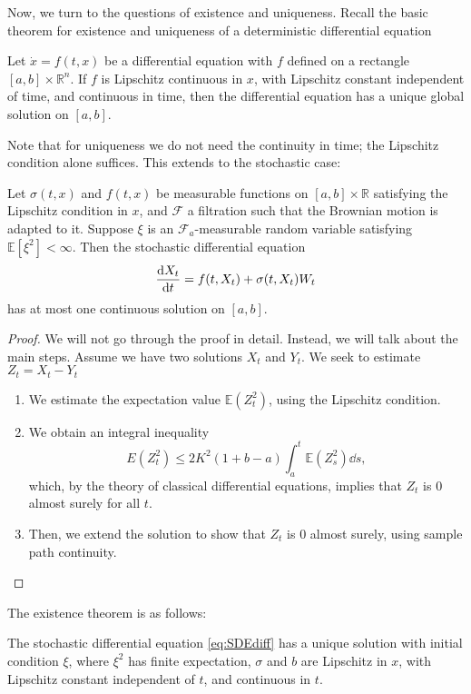 \documentclass[prb,12pt]{revtex4-2}
\theoremstyle{definition}
\theoremstyle{definition}
\theoremstyle{definition}
\newcommand{\R}{\mathbb{R}}
\begin{document}
Now, we turn to the questions of existence and uniqueness. Recall the basic theorem for existence and uniqueness of a deterministic differential equation
\begin{Theorem}
	Let $\dot{x} = f(t,x)$ be a differential equation with $f$ defined on a rectangle $[a,b]\times \R^n$. If $f$ is Lipschitz continuous in $x$, with Lipschitz constant independent of time, and continuous in time, then the differential equation has a unique global solution on $[a,b]$.
\end{Theorem}
Note that for uniqueness we do not need the continuity in time; the Lipschitz condition alone suffices. This extends to the stochastic case:
\begin{Theorem}
	Let $\sigma(t,x)$ and $f(t,x)$ be measurable functions on $[a,b]\times \R$ satisfying the Lipschitz condition in $x$, and $\mathcal{F}$ a filtration such that the Brownian motion is adapted to it. Suppose $\xi$ is an $\mathcal{F}_a$-measurable random variable satisfying $\mathbb{E}[\xi^2]<\infty$. Then the stochastic differential equation
	\[\dv{X_t}{t}=f(t, X_t)+\sigma(t, X_t)W_t\]
	has at most one continuous solution on $[a,b]$.
\end{Theorem}
\begin{proof}
	We will not go through the proof in detail. Instead, we will talk about the main steps. Assume we have two solutions $X_t$ and $Y_t$. We seek to estimate $Z_t=X_t-Y_t$
	\begin{enumerate}
		\item We estimate the expectation value $\mathbb{E}(Z_t^2)$, using the Lipschitz condition.
		\item We obtain an integral inequality
			 \[
			 E(Z_t^2) \le 2K^2 (1+b-a)\int_a^t \mathbb{E}(Z_s^2)\dd{s}
			,\]
			which, by the theory of classical differential equations, implies that $Z_t$ is 0 almost surely for all $t$.
		\item Then, we extend the solution to show that $Z_t$ is $0$ almost surely, using sample path continuity.\qedhere
	\end{enumerate}
\end{proof}
The existence theorem is as follows:
\begin{Theorem}
	The stochastic differential equation \eqref{eq:SDEdiff} has a unique solution with initial condition $\xi$, where $\xi^2$ has finite expectation, $\sigma$ and $b$ are Lipschitz in $x$, with Lipschitz constant independent of $t$, and continuous in $t$.
\end{Theorem}
\end{document}
